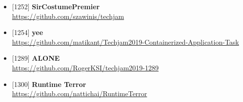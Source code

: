 \begin{itemize}[parsep=0pc]
    \item{} [1252] \textbf{SirCostumePremier} \\
        \href{https://github.com/szawinis/techjam/tree/3a414629506f0ea6d943ada02f3b80685b7c289b}{\ttfamily https://github.com/szawinis/techjam}
    \item{} [1254] \textbf{yee} \\
        \href{https://github.com/matikant/Techjam2019-Containerized-Application-Task/tree/e52585dd660d3b2b7a609c083aa46e920c50b258}{\ttfamily https://github.com/matikant/Techjam2019-Containerized-Application-Task}
    \item{} [1289] \textbf{ALONE} \\
        \href{https://github.com/RogerKSI/techjam2019-1289/tree/79a81ad85e9183dc021b300af8845b78f072f39d}{\ttfamily https://github.com/RogerKSI/techjam2019-1289}
    \item{} [1300] \textbf{Runtime Terror} \\
        \href{https://github.com/nattichai/RuntimeTerror/tree/6d7ffdbad3d18568bea2373287c4dd809591afa7}{\ttfamily https://github.com/nattichai/RuntimeTerror}
\end{itemize}
